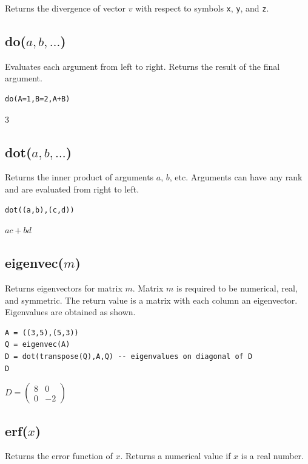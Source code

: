 Returns the divergence of vector $v$ with respect to symbols \verb$x$, \verb$y$, and \verb$z$.

\subsection*{do($a,b,\ldots$)}

Evaluates each argument from left to right.
Returns the result of the final argument.

{\color{blue}
\begin{verbatim}
do(A=1,B=2,A+B)
\end{verbatim}
}

$3$

\subsection*{dot($a,b,\ldots$)}

Returns the inner product of arguments $a$, $b$, etc.
Arguments can have any rank and are evaluated from right to left.

{\color{blue}
\begin{verbatim}
dot((a,b),(c,d))
\end{verbatim}
}

$ac+bd$

\subsection*{eigenvec($m$)}

Returns eigenvectors for matrix $m$.
Matrix $m$ is required to be numerical, real, and symmetric.
The return value is a matrix with each column an eigenvector.
Eigenvalues are obtained as shown.

{\color{blue}
\begin{verbatim}
A = ((3,5),(5,3))
Q = eigenvec(A)
D = dot(transpose(Q),A,Q) -- eigenvalues on diagonal of D
D
\end{verbatim}
}

$\displaystyle
D=\begin{pmatrix}
8 & 0
\\[1ex]
0 & -2
\end{pmatrix}
$

\subsection*{erf($x$)}

Returns the error function of $x$.
Returns a numerical value if $x$ is a real number.

